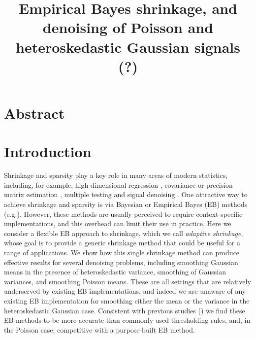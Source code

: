 \documentclass[12pt]{article}
\begin{document}
\title{\textbf{Empirical Bayes shrinkage, and denoising of Poisson and heteroskedastic Gaussian signals (?)}}
\date{}
\maketitle

\section{Abstract}

\section{Introduction}

Shrinkage and sparsity play a key role in many areas of modern statistics, including, for example, high-dimensional regression \cite{Tibshirani1996Regression}, covariance or precision matrix estimation \cite{Bickel2008Covariance}, multiple testing \cite{efron:xx} and signal denoising \cite{Donoho1994Ideal, donoho95}. One attractive way to achieve shrinkage and sparsity is via Bayesian or Empirical Bayes (EB) methods (e.g.\cite{efron?, Johnstone2005Empirical, Clyde2000Flexible,george.mccullogh,bayesian-covariance-estimation}).  
However, these methods are usually perceived to require context-specific implementations, and this overhead can limit their use in practice. Here we consider a flexible EB approach to shrinkage, which we call {\it adaptive shrinkage}, whose goal is to provide a generic shrinkage method that could be useful for a range of applications. 
We show how this single shrinkage method can produce effective results for several denoising problems, including smoothing Gaussian means in the presence of heteroskedastic variance, smoothing of Gaussian variances, and smoothing Poisson means. These are all settings that are relatively underserved by existing EB implementations, and indeed  we are unaware of any existing EB implementation for smoothing either the mean or the variance in the heteroskedastic Gaussian case.
Consistent with previous studies (\cite{Antoniadis2001Wavelet}) we find these EB methods to be more accurate than commonly-used thresholding rules, and, in the Poisson case, competitive with a purpose-built EB method.
\end{document}
